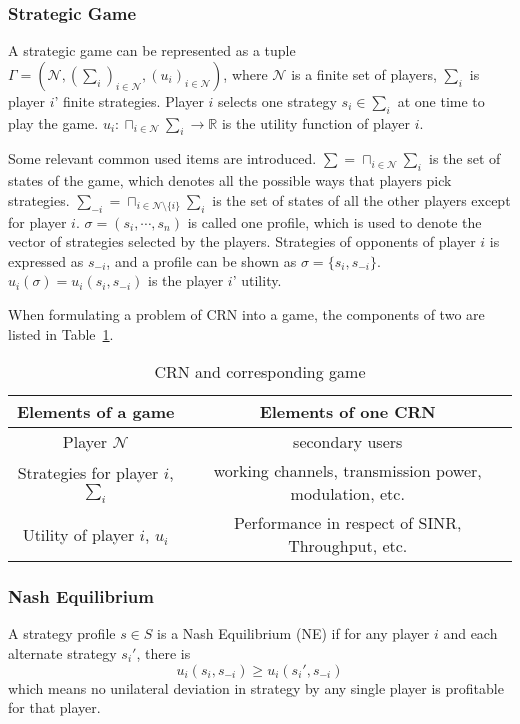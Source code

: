 \subsubsection*{Strategic Game}

A strategic game can be represented as a tuple $\Gamma = (\mathcal{N}, (\sum_i)_{i \in \mathcal{N}}, (u_i)_{i\in \mathcal{N}})$, where $\mathcal{N}$ is a finite set of players, $\sum_i$ is player $i$' finite strategies.
Player $i$ selects one strategy $s_i\in \sum_i$ at one time to play the game.
$u_i:\sqcap_{i\in \mathcal{N}}\sum_i\rightarrow \mathbb{R} $ is the utility function of player $i$.

Some relevant common used items are introduced.
$\sum=\sqcap_{i\in \mathcal{N}}\sum_i$ is the set of states of the game, which denotes all the possible ways that players pick strategies.
$\sum_{-i}=\sqcap_{i\in \mathcal{N}\setminus \{i\}}\sum_i$ is the set of states of all the other players except for player $i$.
$\sigma=(s_i,\cdots,s_n)$ is called one profile, which is used to denote the vector of strategies selected by the players.
Strategies of opponents of player $i$ is expressed as $s_{-i}$, and a profile can be shown as $\sigma=\{s_i, s_{-i}\}$.
$u_i(\sigma) = u_i(s_i, s_{-i})$ is the player $i$' utility.

When formulating a problem of CRN into a game, the components of two are listed in Table~\ref{game_crn_component}.

\begin{table}
\centering
\begin{tabular}{|c|c|}
\hline 
Elements of a game & Elements of one CRN \\ 
\hline 
Player $\mathcal{N}$ & secondary users \\ 
\hline 
Strategies for player $i$, $\sum_i$  & working channels, transmission power, modulation, etc. \\ 
\hline 
Utility of player $i$, $u_i$ & Performance in respect of SINR, Throughput, etc. \\ 
\hline 
\end{tabular} 
\caption{CRN and corresponding game}
\label{game_crn_component}
\end{table}

\subsubsection*{Nash Equilibrium}

A strategy profile $s\in S$ is a Nash Equilibrium (NE) if for any player $i$ and each alternate strategy $s_i'$, there is
 \[ u_i(s_i, s_{-i}) \geq u_i(s_i', s_{-i})\]
which means no unilateral deviation in strategy by any single player is profitable for that player.



